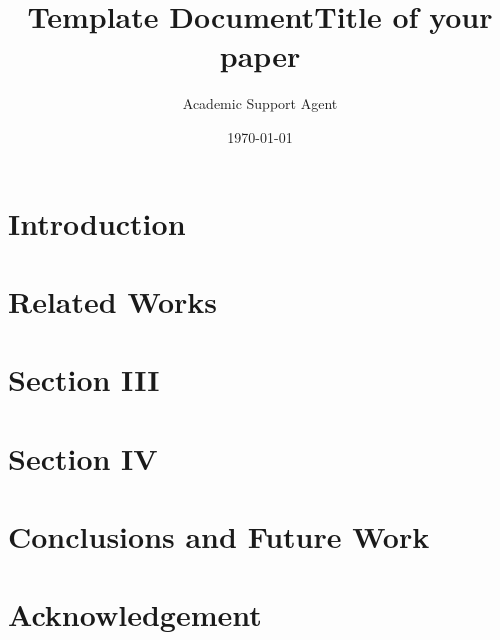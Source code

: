 \documentclass{article}
\title{Template Document}
\author{Academic Support Agent}
\date{\today}
\begin{document}
\maketitle

\title{Title of your paper}



\author{

}


\IEEEoverridecommandlockouts 
{} 

\maketitle




\begin{abstract}

\lipsum[10]

\end{abstract}

\begin{IEEEkeywords}

\end{IEEEkeywords}

\section{Introduction}
\lipsum




\section{Related Works}
\lipsum

\section{Section III}
\lipsum

\section{Section IV}
\lipsum

\section{Conclusions and Future Work}

\lipsum[4]


\section*{Acknowledgement}



\nocite{*}
\end{document}

